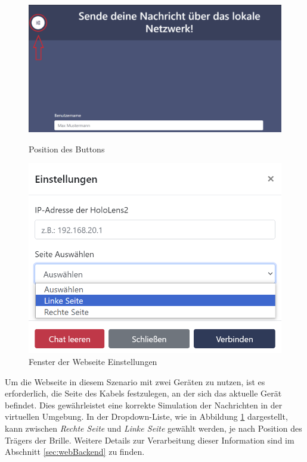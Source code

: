 \begin{figure}[H]
    \centering
    \begin{minipage}[b]{0.7\textwidth}
        \centering
        \includegraphics[width=\textwidth]{images/WebButton}
        \caption{Position des Buttons}
        \label{fig:webbut}
    \end{minipage}
    \hfill
    \begin{minipage}[b]{0.4\textwidth}
        \centering
        \includegraphics[width=\textwidth]{images/WebseiteSettings}
        \caption{Fenster der Webseite Einstellungen}
        \label{fig:websettings}
    \end{minipage}
\end{figure}

Um die Webseite in diesem Szenario mit zwei Geräten zu nutzen, ist es erforderlich, die Seite des Kabels festzulegen, an der sich das aktuelle Gerät befindet. Dies gewährleistet eine korrekte Simulation der Nachrichten in der virtuellen Umgebung. In der Dropdown-Liste, wie in Abbildung \ref{fig:websettings} dargestellt, kann zwischen \textit{Rechte Seite} und \textit{Linke Seite} gewählt werden, je nach Position des Trägers der Brille. Weitere Details zur Verarbeitung dieser Information sind im Abschnitt \ref{sec:webBackend} zu finden.

